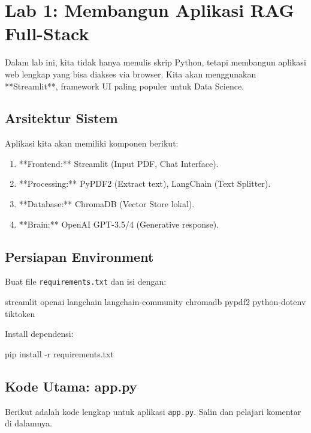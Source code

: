 \chapter{Lab 1: Membangun Aplikasi RAG Full-Stack}
\label{chap:lab1}

Dalam lab ini, kita tidak hanya menulis skrip Python, tetapi membangun aplikasi web lengkap yang bisa diakses via browser. Kita akan menggunakan **Streamlit**, framework UI paling populer untuk Data Science.

\section{Arsitektur Sistem}

Aplikasi kita akan memiliki komponen berikut:
\begin{enumerate}
    \item **Frontend:** Streamlit (Input PDF, Chat Interface).
    \item **Processing:** PyPDF2 (Extract text), LangChain (Text Splitter).
    \item **Database:** ChromaDB (Vector Store lokal).
    \item **Brain:** OpenAI GPT-3.5/4 (Generative response).
\end{enumerate}

\section{Persiapan Environment}

Buat file \texttt{requirements.txt} dan isi dengan:

\begin{codeblock}
streamlit
openai
langchain
langchain-community
chromadb
pypdf2
python-dotenv
tiktoken
\end{codeblock}

Install dependensi:
\begin{codeblock}
pip install -r requirements.txt
\end{codeblock}

\section{Kode Utama: app.py}

Berikut adalah kode lengkap untuk aplikasi \texttt{app.py}. Salin dan pelajari komentar di dalamnya.

